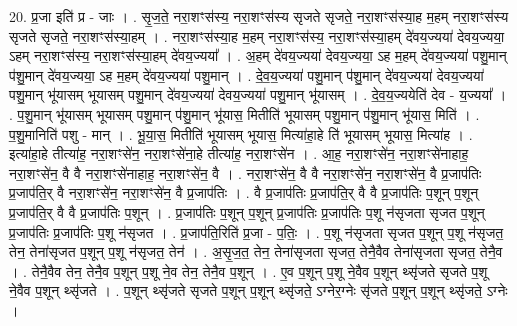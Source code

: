 \documentclass[17pt]{extarticle}
\begin{document}
20. प्र॒जा इति॑ प्र - जाः । . सृ॒ज॒ते॒ नरा॒शꣳस॑स्य॒ नरा॒शꣳस॑स्य सृजते सृजते॒ नरा॒शꣳस॑स्या॒ह म॒हम् नरा॒शꣳस॑स्य सृजते सृजते॒ नरा॒शꣳस॑स्या॒हम् । . नरा॒शꣳस॑स्या॒ह म॒हम् नरा॒शꣳस॑स्य॒ नरा॒शꣳस॑स्या॒हम् दे॑वय॒ज्यया॑ देवय॒ज्यया॒ ऽहम् नरा॒शꣳस॑स्य॒ नरा॒शꣳस॑स्या॒हम् दे॑वय॒ज्यया᳚ । . अ॒हम् दे॑वय॒ज्यया॑ देवय॒ज्यया॒ ऽह म॒हम् दे॑वय॒ज्यया॑ पशु॒मान् प॑शु॒मान् दे॑वय॒ज्यया॒ ऽह म॒हम् दे॑वय॒ज्यया॑ पशु॒मान् । . दे॒व॒य॒ज्यया॑ पशु॒मान् प॑शु॒मान् दे॑वय॒ज्यया॑ देवय॒ज्यया॑ पशु॒मान् भू॑यासम् भूयासम् पशु॒मान् दे॑वय॒ज्यया॑ देवय॒ज्यया॑ पशु॒मान् भू॑यासम् । . दे॒व॒य॒ज्ययेति॑ देव - य॒ज्यया᳚ । . प॒शु॒मान् भू॑यासम् भूयासम् पशु॒मान् प॑शु॒मान् भू॑यास॒ मितीति॑ भूयासम् पशु॒मान् प॑शु॒मान् भू॑यास॒ मिति॑ । . प॒शु॒मानिति॑ पशु - मान् । . भू॒या॒स॒ मितीति॑ भूयासम् भूयास॒ मित्या॑हा॒हे ति॑ भूयासम् भूयास॒ मित्या॑ह । . इत्या॑हा॒हे तीत्या॑ह॒ नरा॒शꣳसे॑न॒ नरा॒शꣳसे॑ना॒हे तीत्या॑ह॒ नरा॒शꣳसे॑न । . आ॒ह॒ नरा॒शꣳसे॑न॒ नरा॒शꣳसे॑नाहाह॒ नरा॒शꣳसे॑न॒ वै वै नरा॒शꣳसे॑नाहाह॒ नरा॒शꣳसे॑न॒ वै । . नरा॒शꣳसे॑न॒ वै वै नरा॒शꣳसे॑न॒ नरा॒शꣳसे॑न॒ वै प्र॒जाप॑तिः प्र॒जाप॑ति॒र् वै नरा॒शꣳसे॑न॒ नरा॒शꣳसे॑न॒ वै प्र॒जाप॑तिः । . वै प्र॒जाप॑तिः प्र॒जाप॑ति॒र् वै वै प्र॒जाप॑तिः प॒शून् प॒शून् प्र॒जाप॑ति॒र् वै वै प्र॒जाप॑तिः प॒शून् । . प्र॒जाप॑तिः प॒शून् प॒शून् प्र॒जाप॑तिः प्र॒जाप॑तिः प॒शू न॑सृजता सृजत प॒शून् प्र॒जाप॑तिः प्र॒जाप॑तिः प॒शू न॑सृजत । . प्र॒जाप॑ति॒रिति॑ प्र॒जा - प॒तिः॒ । . प॒शू न॑सृजता सृजत प॒शून् प॒शू न॑सृजत॒ तेन॒ तेना॑सृजत प॒शून् प॒शू न॑सृजत॒ तेन॑ । . अ॒सृ॒ज॒त॒ तेन॒ तेना॑सृजता सृजत॒ तेनै॒वैव तेना॑सृजता सृजत॒ तेनै॒व । . तेनै॒वैव तेन॒ तेनै॒व प॒शून् प॒शू ने॒व तेन॒ तेनै॒व प॒शून् । . ए॒व प॒शून् प॒शू ने॒वैव प॒शून् थ्सृ॑जते सृजते प॒शू ने॒वैव प॒शून् थ्सृ॑जते । . प॒शून् थ्सृ॑जते सृजते प॒शून् प॒शून् थ्सृ॑जते॒ ऽग्नेर॒ग्नेः सृ॑जते प॒शून् प॒शून् थ्सृ॑जते॒ ऽग्नेः । \newline
\end{document}
